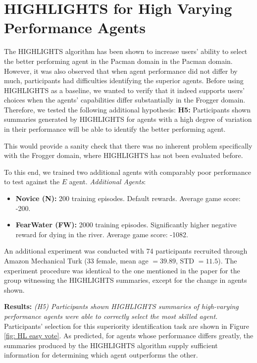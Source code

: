 
\newpage
\appendix
\appendixpage

\section{HIGHLIGHTS for High Varying Performance Agents}
The HIGHLIGHTS algorithm has been shown to increase users' ability to select the better performing
agent in the Pacman domain \cite{amir18highlights} in the Pacman domain. However, it was also observed that when agent performance did not differ by much, participants had difficulties identifying the superior agents. Before using HIGHLIGHTS as a baseline, we wanted to verify that it indeed supports users' choices when the agents' capabilities differ substantially in the Frogger domain. Therefore, we tested the following additional hypothesis:
\textbf{H5:} Participants shown summaries generated by HIGHLIGHTS for agents with a high degree of variation in their performance will be able to identify the better performing agent.

This would provide a sanity check that there was no inherent problem specifically with the
Frogger domain, where HIGHLIGHTS has not been evaluated before.

To this end, we trained two additional agents with comparably poor performance to test against the $E$ agent.
\emph{Additional Agents}: 
\begin{itemize}
    \item \textbf{Novice (N):} 200 training episodes. Default rewards. Average game score: -200.
    \item \textbf{FearWater (FW):} 2000 training episodes. Significantly higher negative reward for dying in the river. Average game score: -1082.
\end{itemize}

An additional experiment was conducted with 74 participants recruited through Amazon Mechanical Turk (33 female, mean
age $= 39.89$, STD $= 11.5$). The experiment procedure was identical to the one mentioned in the paper for the group witnessing the HIGHLIGHTS summaries, except for the change in agents shown.

\textbf{Results:} \emph{(H5) Participants shown HIGHLIGHTS summaries of high-varying performance agents were able to
correctly select the most skilled agent.} Participants’ selection for this superiority identification task are shown in Figure \ref{fig: HL easy vote}. As predicted, for agents whose
performance differs greatly, the summaries produced by the HIGHLIGHTS algorithm supply sufficient information for determining which agent outperforms the other. 

